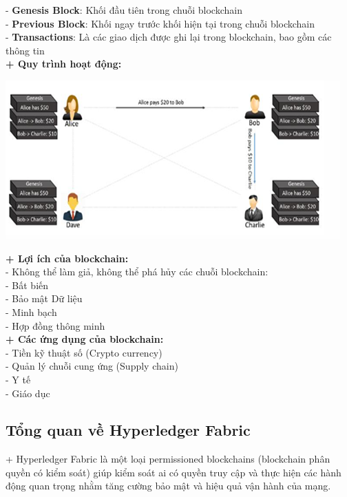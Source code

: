 \documentclass[a4paper,12pt]{article}
\begin{document}
\begin{itemize}
- \textbf{Genesis Block}: Khối đầu tiên trong chuỗi blockchain\\
- \textbf{Previous Block}: Khối ngay trước khối hiện tại trong chuỗi blockchain\\
- \textbf{Transactions}: Là các giao dịch được ghi lại trong blockchain, bao gồm các thông tin\\
\textbf{+ Quy trình hoạt động:}
\end{itemize}
\begin{center}
\includegraphics[scale=1.5]{Anh/A3.png}
\end{center}\vspace{10cm}
\textbf{+ Lợi ích của blockchain:}\\
- Không thể làm giả, không thể phá hủy các chuỗi blockchain:\\
- Bất biến\\
- Bảo mật Dữ liệu\\
- Minh bạch\\
- Hợp đồng thông minh\\
\textbf{+ Các ứng dụng của blockchain:}\\
- Tiền kỹ thuật số (Crypto currency)\\
- Quản lý chuỗi cung ứng (Supply chain)\\
- Y tế\\
- Giáo dục\\

{\color{red} \subsection{Tổng quan về Hyperledger Fabric}}

+ Hyperledger Fabric là một loại permissioned blockchains (blockchain phân quyền có kiểm soát) giúp kiểm soát ai có quyền truy cập và thực hiện các hành động quan trọng nhằm tăng cường bảo mật và hiệu quả vận hành của mạng.
\end{document}
